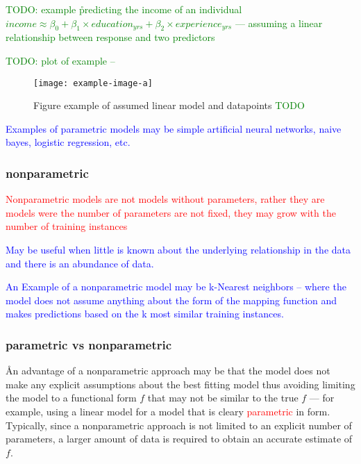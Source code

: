 
\textcolor{green}{TODO: example \r{predicting the income of an individual $income \approx \beta_0 + \beta_1 \times education_{yrs} + \beta_2 \times experience_{yrs}$ --- assuming a linear relationship between response and two predictors}}

\textcolor{green}{TODO: plot of example -- }

\begin{figure}[htp]
	\centering
	\texttt{[image: example-image-a]}\hfil
	\caption{Figure example of assumed linear model and datapoints \textcolor{green}{TODO}}
	\label{fig:basics_para_assume_linear}
\end{figure}



\textcolor{blue}{Examples of parametric models may be simple artificial neural networks, naive bayes, logistic regression, etc.}

\subsubsection{nonparametric}

\textcolor{red}{Nonparametric models are not models without parameters, rather they are models were the number of parameters are not fixed, they may grow with the number of training instances}

\textcolor{blue}{May be useful when little is known about the underlying relationship in the data and there is an abundance of data.}

\textcolor{blue}{An Example of a nonparametric model may be k-Nearest neighbors -- where the model does not assume anything about the form of the mapping function and makes predictions based on the k most similar training instances.}

\subsubsection{parametric vs nonparametric}

\r{An advantage of a nonparametric approach may be that the model does not make any explicit assumptions about the best fitting model thus avoiding limiting the model to a functional form $f$ that may not be similar to the true $f$ --- for example, using a linear model for a model that is cleary \textcolor{red}{parametric} in form. Typically, since a nonparametric approach is not limited to an explicit number of parameters, a larger amount of data is required to obtain an accurate estimate of $f$.}

